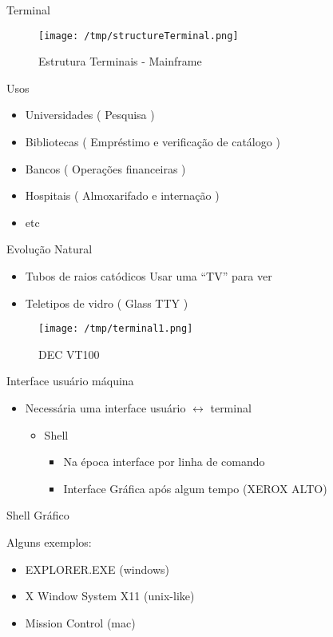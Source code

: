 \documentclass[presentation,aspectratio=169,14pt]{beamer}
\begin{document}
\begin{frame}[label={sec:orgcabbf6a}]{Terminal}
\begin{figure}[htbp]
\centering
\texttt{[image: /tmp/structureTerminal.png]}
\caption{Estrutura Terminais - Mainframe}
\end{figure}
\end{frame}
\begin{frame}[label={sec:orgf66ba05}]{Usos}
\begin{itemize}
\item Universidades ( Pesquisa ) \pause
\item Bibliotecas ( Empréstimo e verificação de catálogo ) \pause
\item Bancos ( Operações financeiras )\pause
\item Hospitais ( Almoxarifado e internação )
\item etc
\end{itemize}
\end{frame}
\begin{frame}[label={sec:org85fef62}]{Evolução Natural}
\begin{itemize}
\item Tubos de raios catódicos \pause Usar uma ``TV'' para ver \pause
\item Teletipos de vidro ( Glass TTY ) \pause
\end{itemize}
\begin{figure}[htbp]
\centering
\texttt{[image: /tmp/terminal1.png]}
\caption{DEC VT100}
\end{figure}
\end{frame}
\begin{frame}[label={sec:org302ef0d}]{Interface usuário máquina}
\begin{itemize}
\item Necessária uma interface usuário \(\leftrightarrow\) terminal \pause
\begin{itemize}
\item Shell \pause
\begin{itemize}
\item Na época interface por linha de comando  \pause
\item Interface Gráfica após algum tempo (XEROX ALTO)
\end{itemize}
\end{itemize}
\end{itemize}
\end{frame}
\begin{frame}[label={sec:orgb455bcc}]{Shell Gráfico}
\begin{block}{Alguns exemplos:}
\begin{itemize}
\item EXPLORER.EXE (windows)
\item X Window System  X11 (unix-like)
\item Mission Control (mac)
\end{itemize}
\end{block}
\end{frame}
\end{document}
